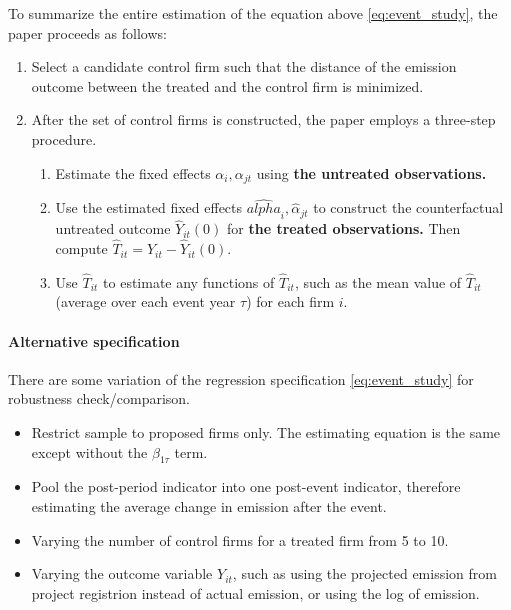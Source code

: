 \documentclass[12pt]{article}[margin=1in]
\begin{document}
To summarize the entire estimation of the equation above \ref{eq:event_study}, the paper proceeds as follows:
\begin{enumerate}
    \item  Select a candidate control firm such that the distance of the emission outcome between the treated and the control firm is minimized.
    \item After the set of control firms is constructed, the paper employs a three-step procedure.
          \begin{enumerate}
              \item Estimate the fixed effects $\alpha_i,\alpha_{jt}$ using \textbf{the untreated observations.}
              \item Use the estimated fixed effects $\hat{alpha}_i,\hat{\alpha}_{jt}$ to construct the counterfactual untreated outcome $\hat{Y}_{it}(0)$ for \textbf{the treated observations.} Then compute $\hat{T}_{it} = Y_{it} - \hat{Y}_{it}(0)$.
              \item Use $\hat{T}_{it}$ to estimate any functions of $\hat{T}_{it}$, such as the mean value of $\hat{T}_{it}$ (average over each event year $\tau$) for each firm $i$.
          \end{enumerate}
\end{enumerate}

\paragraph{Alternative specification}There are some variation of the regression specification \ref{eq:event_study} for robustness check/comparison.
\begin{itemize}
    \item Restrict sample to proposed firms only. The estimating equation is the same except without the $\beta_{1\tau}$ term.
    \item Pool the post-period indicator into one post-event indicator, therefore estimating the average change in emission after the event.
    \item Varying the number of control firms for a treated firm from 5 to 10.
    \item Varying the outcome variable $Y_{it}$, such as using the projected emission from project registrion instead of actual emission, or using the log of emission.
\end{itemize}

\end{document}
